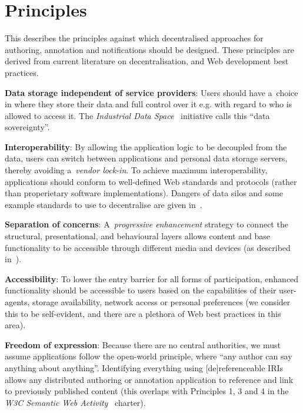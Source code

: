 \documentclass[a4paper]{llncs}
\begin{document}
\section{Principles}
\label{principles}

\par This describes the principles against which decentralised approaches for authoring, annotation and notifications should be designed. These principles are derived from current literature on decentralisation, and Web development best practices.

\par \textbf{Data storage independent of service providers}: Users should have a choice in where they store their data and full control over it e.g. with regard to who is allowed to access it. The \textit{Industrial Data Space}~\cite{ref-1} initiative calls this ``data sovereignty''.

\par \textbf{Interoperability}: By allowing the application logic to be decoupled from the data, users can switch between applications and personal data storage servers, thereby avoiding a \textit{vendor lock-in}. To achieve maximum interoperability, applications should conform to well-defined Web standards and protocols (rather than properietary software implementations). Dangers of data silos and some example standards to use to decentralise are given in~\cite{ref-2}.

\par \textbf{Separation of concerns}: A \textit{progressive enhancement} strategy to connect the structural, presentational, and behavioural layers allows content and base functionality to be accessible through different media and devices (as described in~\cite{ref-3}).

\par \textbf{Accessibility}: To lower the entry barrier for all forms of participation, enhanced functionality should be accessible to users based on the capabilities of their user-agents, storage availability, network access or personal preferences (we consider this to be self-evident, and there are a plethora of Web best practices in this area).

\par \textbf{Freedom of expression}: Because there are no central authorities, we must assume applications follow the open-world principle, where ``any author can say anything about anything''. Identifying everything using [de]referenceable IRIs allows any distributed authoring or annotation application to reference and link to previously published content (this overlaps with Principles 1, 3 and 4 in the \textit{W3C Semantic Web Activity}~\cite{ref-4} charter).
\end{document}
